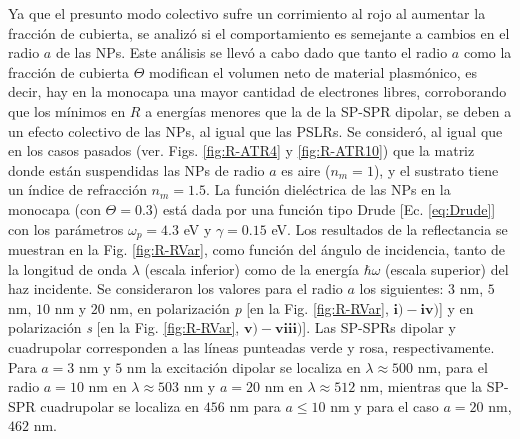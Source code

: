  Ya que el presunto modo colectivo sufre un corrimiento al rojo al aumentar la fracción de cubierta, se analizó si el comportamiento es semejante a cambios en el radio $a$ de las NPs.  Este análisis se llevó a cabo dado que tanto el radio $a$ como la fracción de cubierta $\Theta$ modifican el volumen neto de material plasmónico, es decir, hay en la monocapa una mayor cantidad de electrones libres, corroborando que los mínimos en $R$  a energías menores que la de la SP-SPR dipolar, se deben a un efecto colectivo de las NPs, al igual que las PSLRs. Se consideró, al igual que en los casos pasados (ver. Figs. \ref{fig:R-ATR4} y  \ref{fig:R-ATR10}) que la matriz donde están suspendidas las NPs de radio $a$ es aire ($n_m = 1$), y el sustrato tiene un índice de refracción $n_m= 1.5$. La función dieléctrica de las NPs en la monocapa (con $\Theta=0.3$) está dada por una función tipo Drude [Ec. \eqref{eq:Drude}] con los parámetros $\omega_p =4.3$ eV y $\gamma=0.15$ eV. Los resultados de la reflectancia se muestran en la Fig.  \ref{fig:R-RVar}, como función del ángulo de incidencia, tanto de la longitud de onda $\lambda$ (escala inferior) como de la  energía $\hbar\omega$ (escala superior) del haz incidente. Se consideraron los valores para el radio $a$ los siguientes: $3$ nm, $5$ nm, $10$ nm y $20$ nm,  en polarización \emph{p} [en la Fig.  \ref{fig:R-RVar}, $\mathbf{i)-iv)}$] y en polarización \emph{s} [en la Fig.  \ref{fig:R-RVar}, $\mathbf{v)-viii)}$].  Las SP-SPRs dipolar y cuadrupolar corresponden a las líneas punteadas verde y rosa, respectivamente. Para $a = 3$ nm y $5$ nm la excitación dipolar se localiza en $\lambda\approx 500$ nm, para el radio  $a = 10$ nm en $\lambda\approx 503$ nm y $a=20$ nm en $\lambda\approx 512$ nm, mientras que la SP-SPR cuadrupolar se localiza en $456$ nm para $a\leq 10$ nm y para el caso  $a=20$ nm, $462$ nm.


